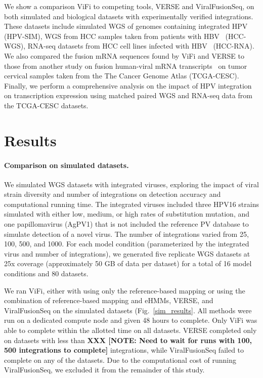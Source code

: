 \documentclass[11pt]{article}
\begin{document}
We show a comparison ViFi to competing tools, VERSE and ViralFusionSeq, on both simulated and biological datasets with experimentally verified integrations.  These datasets include simulated WGS of genomes containing integrated HPV (HPV-SIM), WGS from HCC samples taken from patients with HBV~\cite{Sung2012} (HCC-WGS), RNA-seq datasets from HCC cell lines infected with HBV~\cite{Lau2014} (HCC-RNA).  We also compared the fusion mRNA sequences found by ViFi and VERSE to those from another study on fusion human-viral mRNA transcripts~\cite{Tang2013} on tumor cervical samples taken from the The Cancer Genome Atlas (TCGA-CESC).  Finally, we perform a comprehensive analysis on the impact of HPV integration on transcription expression using matched paired WGS and RNA-seq data from the TCGA-CESC datasets.  

\section*{Results}

\paragraph{\textbf{Comparison on simulated datasets.}}  We simulated WGS datasets with integrated viruses, exploring the impact of viral strain diversity and number of integrations on detection accuracy and computational running time.  The integrated viruses included three HPV16 strains simulated with either low, medium, or high rates of substitution mutation, and one papillomavirus (AgPV1) that is not included the reference PV database to simulate detection of a novel virus.  The number of integrations varied from 25, 100, 500, and 1000.  For each model condition (parameterized by the integrated virus and number of integrations), we generated five replicate WGS datasets at 25x coverage (approximately 50 GB of data per dataset) for a total of 16 model conditions and 80 datasets.  

We ran ViFi, either with using only the reference-based mapping or using the combination of reference-based mapping and eHMMs, VERSE, and ViralFusionSeq on the simulated datasets (Fig.~\ref{sim_results}.  All methods were run on a dedicated compute node and given 48 hours to complete.  Only ViFi was able to complete within the allotted time on all datasets. VERSE completed only on datasets with less than \textbf{XXX [NOTE:  Need to wait for runs with 100, 500 integrations to complete]} integrations, while ViralFusionSeq failed to complete on any of the datasets.  Due to the computational cost of running ViralFusionSeq, we excluded it from the remainder of this study.
\end{document}
